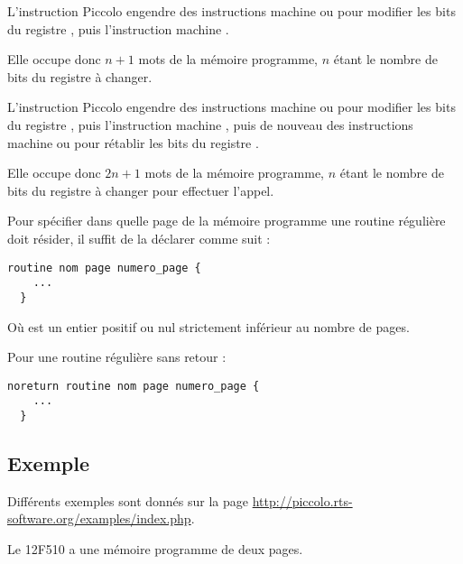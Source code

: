 
L'instruction Piccolo   engendre des instructions machine  ou  pour modifier les bits  du registre , puis l'instruction machine .

Elle occupe donc $n+1$ mots de la mémoire programme, $n$ étant le nombre de bits  du registre  à changer.





L'instruction Piccolo   engendre des instructions machine  ou  pour modifier les bits  du registre , puis l'instruction machine , puis de nouveau des instructions machine  ou  pour rétablir les bits  du registre .

Elle occupe donc $2n+1$ mots de la mémoire programme, $n$ étant le nombre de bits  du registre  à changer pour effectuer l'appel.


Pour spécifier dans quelle page de la mémoire programme une routine régulière doit résider, il suffit de la déclarer comme suit :
\begin{lstlisting}[language=piccolo]
  routine nom page numero_page {
    ...
  }
\end{lstlisting}

Où  est un entier positif ou nul strictement inférieur au nombre de pages.

Pour une routine régulière sans retour :
\begin{lstlisting}[language=piccolo]
  noreturn routine nom page numero_page {
    ...
  }
\end{lstlisting}

\subsection{Exemple}

Différents exemples sont donnés sur la page \url{http://piccolo.rts-software.org/examples/index.php}.

Le 12F510 a une mémoire programme de deux pages. 

